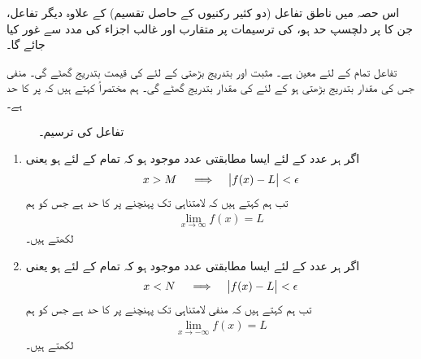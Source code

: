 اس حصہ میں  ناطق تفاعل (دو کثیر رکنیوں کے حاصل تقسیم)  کے علاوہ دیگر تفاعل، جن کا  پر دلچسپ حد ہو، کی ترسیمات پر  متقارب اور غالب اجزاء کی مدد سے   غور کیا جائے گا۔

تفاعل  تمام  کے لئے معین ہے۔ مثبت اور بتدریج بڑھتی   کے لئے  کی قیمت بتدریج  گھٹے گی۔ منفی  جس کی مقدار بتدریج بڑھتی ہو  کے لئے  کی مقدار بتدریج  گھٹے گی۔ ہم مختصراً کہتے ہیں کہ  پر  کا حد  ہے۔ 
\begin{figure}
\centering
{}
\caption{تفاعل  کی ترسیم۔}
\label{شکل_استعمال_حد_معکوس_ترسیم}
\end{figure}

\begin{enumerate}[1.]
\item
اگر ہر عدد  کے لئے ایسا مطابقتی عدد  موجود ہو کہ تمام   کے لئے  ہو یعنی
\begin{align*}
x>M\quad \implies \quad \abs{f(x)-L}<\epsilon
\end{align*}
 تب ہم کہتے ہیں کہ  لامتناہی تک پہنچنے پر   کا حد  ہے جس کو ہم
\begin{align*}
\lim_{x\to\infty} f(x)=L
\end{align*}
لکھتے ہیں۔
\item
اگر ہر عدد  کے لئے ایسا مطابقتی عدد  موجود ہو کہ تمام   کے لئے  ہو یعنی
\begin{align*}
x<N\quad \implies \quad \abs{f(x)-L}<\epsilon
\end{align*}
 تب ہم کہتے ہیں کہ  منفی لامتناہی تک پہنچنے پر   کا حد  ہے جس کو ہم
\begin{align*}
\lim_{x\to-\infty} f(x)=L
\end{align*}
لکھتے ہیں۔

\end{enumerate}

